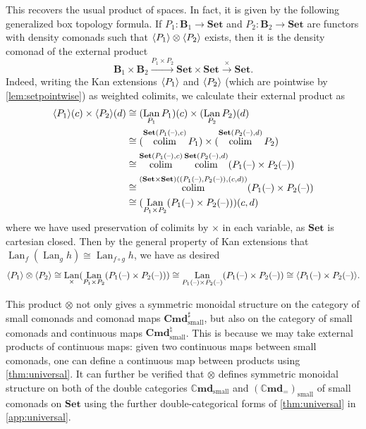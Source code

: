 \documentclass[11pt, oneside, article]{memoir}
\theoremstyle{plain}
\theoremstyle{definition}
\theoremstyle{remark}
\newenvironment{remark}
{\renewcommand\qedsymbol{$\lrcorner$}%
  \pushQED{\qed}\myremark}
{\popQED\endmyremark}
\DeclareMathOperator{\Lan}{Lan}
\DeclareMathOperator{\colimw}{colim}
\DeclarePairedDelimiter{\gen}{\langle}{\rangle}
\DeclarePairedDelimiter{\abs}{\lvert}{\rvert}
\newcommand{\dash}{{\mathord{\text{--}}}}
\newcommand{\xto}[1]{\xrightarrow{#1}}
\newcommand{\namedcat}[1]{\mathbf{#1}}
\newcommand{\cat}[1]{\mathbf{#1}}
\newcommand{\Set}{\namedcat{Set}}
\newcommand{\Cmd}{\mathbb{C}\namedcat{md}}
\newcommand{\CmdId}{\Cmd_=}
\newcommand{\Com}{\namedcat{Cmd}^\sharp}
\newcommand{\Con}{\namedcat{Cmd}^\natural}
\newcommand{\pts}[1]{{\abs{#1}}}
\newcommand{\ph}[1]{#1}
\newcommand{\Ho}[1]{#1}
\newcommand{\AccCom}{\Com_{\mathrm{small}}}
\newcommand{\AccCon}{\Con_{\mathrm{small}}}
\newcommand{\AccCmd}{\Cmd_{\mathrm{small}}}
\newcommand{\AccCmdId}{(\CmdId)_{\mathrm{small}}}
\newcommand{\AccComSet}{\AccCom}
\newcommand{\AccConSet}{\AccCon}
\newcommand{\AccCmdSet}{\AccCmd}
\newcommand{\AccCmdIdSet}{\AccCmdId}
\newcommand{\bB}{\cat{B}}
\newcommand{\pP}{\ph{P}}
\newcommand{\La}[2]{\Lan_{#1}#2}
\begin{document}
\begin{remark}
  
  This recovers the usual product of spaces.  In
  fact, it is given by the following generalized box topology
  formula. If $\pP_1 \colon \bB_1 \to \Set$ and
  $\pP_2 \colon \bB_2 \to \Set$ are functors with density comonads
  such that $\gen{\pP_1} \otimes \gen{\pP_2}$
  exists, then it is the density comonad of the external product
  \[\bB_1 \times \bB_2 \xto{\pP_1 \times \pP_2} \Set \times \Set
    \xto{\times} \Set.\] Indeed, writing the Kan extensions
  $\gen{\pP_1}$ and $\gen{\pP_2}$ (which are pointwise by
  \cref{lem:setpointwise}) as weighted colimits, we calculate their
  external product as
  \begin{align*}
    \gen{\pP_1}(c) \times \gen{\pP_2}(d)
    &\cong (\La{\pP_1}{\pP_1})(c) \times (\La{\pP_2}{\pP_2})(d)\\
    &\cong (\colimw^{\Ho{\Set}(\pP_1 (\dash), c)}\pP_1) \times (\colimw^{\Ho{\Set}(\pP_2 (\dash), d)} \pP_2)\\
    &\cong \colimw^{\Ho{\Set}(\pP_1 (\dash), c)}\colimw^{\Ho{\Set}(\pP_2 (\dash), d)}(\pP_1(\dash) \times \pP_2(\dash))\\
    &\cong \colimw^{\Ho{(\Set \times \Set)}((\pP_1(\dash), \pP_2(\dash)), (c,d))} (\pP_1(\dash) \times \pP_2(\dash))\\
    &\cong (\La{\pP_1 \times \pP_2}{(\pP_1(\dash) \times \pP_2(\dash))})(c, d)
  \end{align*} where we have used preservation of colimits by $\times$ in each
  variable, as $\Set$ is cartesian closed.
  Then by the general property of Kan extensions that
  $\La{f}{(\La{g}{h})} \cong \La{f \circ g}{h}$, we have as desired
  \[%
    \gen{\pP_1} \otimes \gen{\pP_2} \cong \La{\times}{(\La{\pP_1
        \times \pP_2}{(\pP_1(\dash) \times \pP_2(\dash))})} \cong
    \La{\pP_1(\dash) \times \pP_2(\dash)}{(\pP_1(\dash) \times
      \pP_2(\dash))} \cong \gen{\pP_1(\dash) \times \pP_2(\dash)}.\]
  

  This product $\otimes$ not only gives a symmetric monoidal structure
  on the category of small comonads and comonad maps $\AccComSet$, but
  also on the category of small comonads and continuous maps
  $\AccConSet$. This is because we may take external products of
  continuous maps: given two continuous maps between small comonads,
  one can define a continuous map between products using
  \cref{thm:universal}. It can further be verified that $\otimes$
  defines symmetric monoidal structure on both of the double
  categories $\AccCmdSet$ and $\AccCmdIdSet$ of small comonads on
  $\Set$ using the further double-categorical forms of
  \cref{thm:universal} in \cref{app:universal}.
\end{remark}
\end{document}
